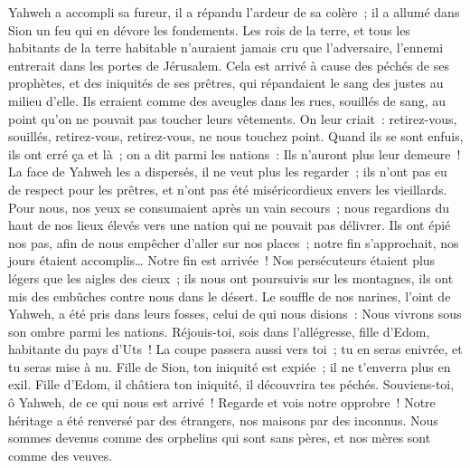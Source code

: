 \begin{multicols}{2}
 Yahweh a accompli sa fureur, il a répandu l'ardeur de sa colère~; il a allumé dans Sion un feu qui en dévore les fondements.
 Les rois de la terre, et tous les habitants de la terre habitable n'auraient jamais cru que l'adversaire, l'ennemi entrerait dans les portes de Jérusalem.
 Cela est arrivé à cause des péchés de ses prophètes, et des iniquités de ses prêtres, qui répandaient le sang des justes au milieu d'elle.
 Ils erraient comme des aveugles dans les rues, souillés de sang, au point qu'on ne pouvait pas toucher leurs vêtements.
 On leur criait~: retirez-vous, souillés, retirez-vous, retirez-vous, ne nous touchez point. Quand ils se sont enfuis, ils ont erré ça et là~; on a dit parmi les nations~: Ils n'auront plus leur demeure~!
 La face de Yahweh les a dispersés, il ne veut plus les regarder~; ils n'ont pas eu de respect pour les prêtres, et n'ont pas été miséricordieux envers les vieillards.
 Pour nous, nos yeux se consumaient après un vain secours~; nous regardions du haut de nos lieux élevés vers une nation qui ne pouvait pas délivrer.
 Ils ont épié nos pas, afin de nous empêcher d'aller sur nos places~; notre fin s'approchait, nos jours étaient accomplis… Notre fin est arrivée~!
 Nos persécuteurs étaient plus légers que les aigles des cieux~; ils nous ont poursuivis sur les montagnes, ils ont mis des embûches contre nous dans le désert.
 Le souffle de nos narines, l'oint de Yahweh, a été pris dans leurs fosses, celui de qui nous disions~: Nous vivrons sous son ombre parmi les nations.
 Réjouis-toi, sois dans l'allégresse, fille d'Edom, habitante du pays d'Uts~! La coupe passera aussi vers toi~; tu en seras enivrée, et tu seras mise à nu.
 Fille de Sion, ton iniquité est expiée~; il ne t'enverra plus en exil. Fille d'Edom, il châtiera ton iniquité, il découvrira tes péchés.
\VerseOne{}Souviens-toi, ô Yahweh, de ce qui nous est arrivé~! Regarde et vois notre opprobre~!
Notre héritage a été renversé par des étrangers, nos maisons par des inconnus.
Nous sommes devenus comme des orphelins qui sont sans pères, et nos mères sont comme des veuves.

\end{multicols}
